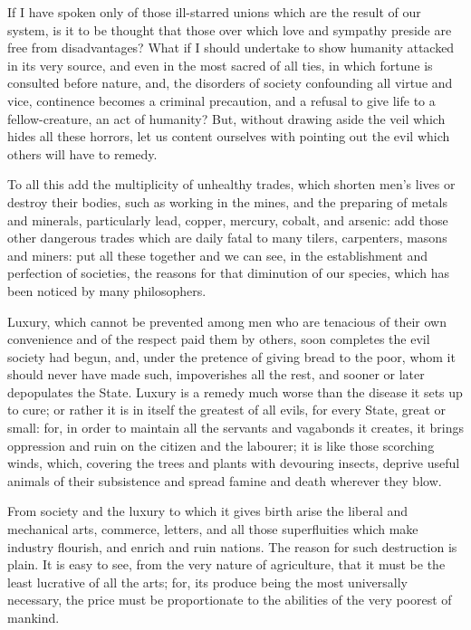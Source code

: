 \documentclass[12pt]{report}
\begin{document}
If I have spoken only of those ill-starred unions which are the result of our system, is it to be thought that those over which love and sympathy preside are free from disadvantages? What if I should undertake to show humanity attacked in its very source, and even in the most sacred of all ties, in which fortune is consulted before nature, and, the disorders of society confounding all virtue and vice, continence becomes a criminal precaution, and a refusal to give life to a fellow-creature, an act of humanity? But, without drawing aside the veil which hides all these horrors, let us content ourselves with pointing out the evil which others will have to remedy.

To all this add the multiplicity of unhealthy trades, which shorten men's lives or destroy their bodies, such as working in the mines, and the preparing of metals and minerals, particularly lead, copper, mercury, cobalt, and arsenic: add those other dangerous trades which are daily fatal to many tilers, carpenters, masons and miners: put all these together and we can see, in the establishment and perfection of societies, the reasons for that diminution of our species, which has been noticed by many philosophers.

Luxury, which cannot be prevented among men who are tenacious of their own convenience and of the respect paid them by others, soon completes the evil society had begun, and, under the pretence of giving bread to the poor, whom it should never have made such, impoverishes all the rest, and sooner or later depopulates the State. Luxury is a remedy much worse than the disease it sets up to cure; or rather it is in itself the greatest of all evils, for every State, great or small: for, in order to maintain all the servants and vagabonds it creates, it brings oppression and ruin on the citizen and the labourer; it is like those scorching winds, which, covering the trees and plants with devouring insects, deprive useful animals of their subsistence and spread famine and death wherever they blow.

From society and the luxury to which it gives birth arise the liberal and mechanical arts, commerce, letters, and all those superfluities which make industry flourish, and enrich and ruin nations. The reason for such destruction is plain. It is easy to see, from the very nature of agriculture, that it must be the least lucrative of all the arts; for, its produce being the most universally necessary, the price must be proportionate to the abilities of the very poorest of mankind.
\end{document}
